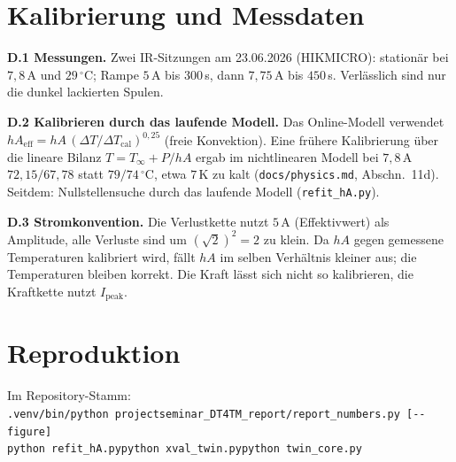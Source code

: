\documentclass[a4paper, 10pt, conference]{ieeeconf}
\theoremstyle{remark}
\begin{document}
\section{Kalibrierung und Messdaten}
\label{app:calib}

\textbf{D.1 Messungen.} Zwei IR-Sitzungen am 23.06.2026 (HIKMICRO):
stationär bei $7{,}8\,$A und $29\,^\circ$C; Rampe $5\,$A bis $300\,$s, dann
$7{,}75\,$A bis $450\,$s. Verlässlich sind nur die dunkel lackierten Spulen.

\textbf{D.2 Kalibrieren durch das laufende Modell.} Das Online-Modell
verwendet $hA_{\mathrm{eff}}=hA\,(\Delta T/\Delta T_{\mathrm{cal}})^{0{,}25}$
(freie Konvektion). Eine frühere Kalibrierung über die lineare Bilanz
$T=T_\infty+P/hA$ ergab im nichtlinearen Modell bei $7{,}8\,$A
$72{,}15/67{,}78$ statt $79/74\,^\circ$C, etwa $7\,$K zu kalt
(\texttt{docs/physics.md}, Abschn.~11d). Seitdem: Nullstellensuche durch das
laufende Modell (\texttt{refit\_hA.py}).

\textbf{D.3 Stromkonvention.} Die Verlustkette nutzt $5\,$A (Effektivwert)
als Amplitude, alle Verluste sind um $(\sqrt2)^2=2$ zu klein. Da $hA$ gegen
gemessene Temperaturen kalibriert wird, fällt $hA$ im selben Verhältnis
kleiner aus; die Temperaturen bleiben korrekt. Die Kraft lässt sich nicht so
kalibrieren, die Kraftkette nutzt $I_{\mathrm{peak}}$.

\section{Reproduktion}
\label{app:repro}

Im Repository-Stamm:\\
\texttt{.venv/bin/python projectseminar\_DT4TM\_report/report\_numbers.py [-{}-figure]}\\
\texttt{python refit\_hA.py}\quad\texttt{python xval\_twin.py}\quad\texttt{python twin\_core.py}



\end{document}
